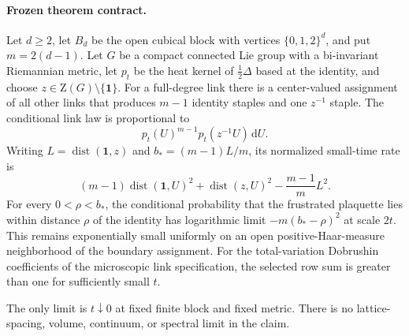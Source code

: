 \paragraph{Frozen theorem contract.}
Let $d\geq2$, let $B_d$ be the open cubical block with vertices
$\{0,1,2\}^d$, and put $m=2(d-1)$.  Let $G$ be a compact connected Lie group
with a bi-invariant Riemannian metric, let $p_t$ be the heat kernel of
$\tfrac12\Delta$ based at the identity, and choose
$z\in\mathrm Z(G)\setminus\{\mathbf1\}$.  For a full-degree link there is a
center-valued assignment of all other links that produces $m-1$ identity
staples and one $z^{-1}$ staple.  The conditional link law is proportional to
\[
  p_t(U)^{m-1}p_t(z^{-1}U)\,\mathrm dU.
\]
Writing $L=\operatorname{dist}(\mathbf1,z)$ and
$b_*=(m-1)L/m$, its normalized small-time rate is
\[
 (m-1)\operatorname{dist}(\mathbf1,U)^2
 +\operatorname{dist}(z,U)^2-\frac{m-1}{m}L^2.
\]
For every $0<\rho<b_*$, the conditional probability that the frustrated
plaquette lies within distance $\rho$ of the identity has logarithmic limit
$-m(b_*-\rho)^2$ at scale $2t$.  This remains exponentially small uniformly
on an open positive-Haar-measure neighborhood of the boundary assignment.
For the total-variation Dobrushin coefficients of the microscopic link
specification, the selected row sum is greater than one for sufficiently
small $t$.

The only limit is $t\downarrow0$ at fixed finite block and fixed metric.
There is no lattice-spacing, volume, continuum, or spectral limit in the
claim.
